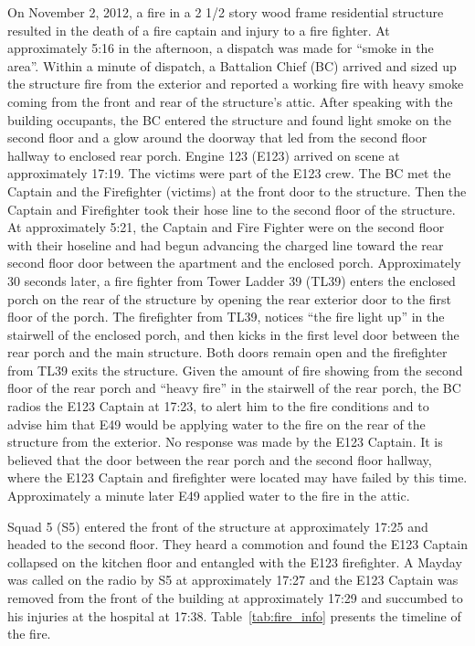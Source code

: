 \documentclass[11pt,oneside]{book}
\begin{document}
On November 2, 2012, a fire in a 2 1/2 story wood frame residential structure resulted in the death of a fire captain and injury to a fire fighter. At approximately 5:16 in the afternoon, a dispatch was made for ``smoke in the area''. Within a minute of dispatch, a Battalion Chief (BC) arrived and sized up the structure fire from the exterior and reported a working fire with heavy smoke coming from the front and rear of the structure's attic. After speaking with the building occupants, the BC entered the structure and found light smoke on the second floor and a glow around the doorway that led from the second floor hallway to enclosed rear porch. Engine 123 (E123) arrived on scene at approximately 17:19. The victims were part of the E123 crew.  The BC met the Captain and the Firefighter (victims) at the front door to the structure.  Then the Captain and Firefighter took their hose line to the second floor of the structure. At approximately 5:21, the Captain and Fire Fighter were on the second floor with their hoseline and had begun advancing the charged line toward the rear second floor door between the apartment and the enclosed porch. Approximately 30 seconds later, a fire fighter from Tower Ladder 39 (TL39) enters the enclosed porch on the rear of the structure by opening the rear exterior door to the first floor of the porch. The firefighter from TL39, notices ``the fire light up'' in the stairwell of the enclosed porch, and then kicks in the first level door between the rear porch and the main structure. Both doors remain open and the firefighter from TL39 exits the structure. Given the amount of fire showing from the second floor of the rear porch and ``heavy fire'' in the stairwell of the rear porch, the BC radios the E123 Captain at 17:23, to alert him to the fire conditions and to advise him that E49 would be applying water to the fire on the rear of the structure from the exterior. No response was made by the E123 Captain. It is believed that the door between the rear porch and the second floor hallway, where the E123 Captain and firefighter were located may have failed by this time.  Approximately a minute later E49 applied water to the fire in the attic.

Squad 5 (S5) entered the front of the structure at approximately 17:25 and headed to the second floor. They heard a commotion and found the E123 Captain collapsed on the kitchen floor and entangled with the E123 firefighter. A Mayday was called on the radio by S5 at approximately  17:27 and the E123 Captain was removed from the front of the building at approximately 17:29 and succumbed to his injuries at the hospital at 17:38. Table~\ref{tab:fire_info} presents the timeline of the fire.
\end{document}
